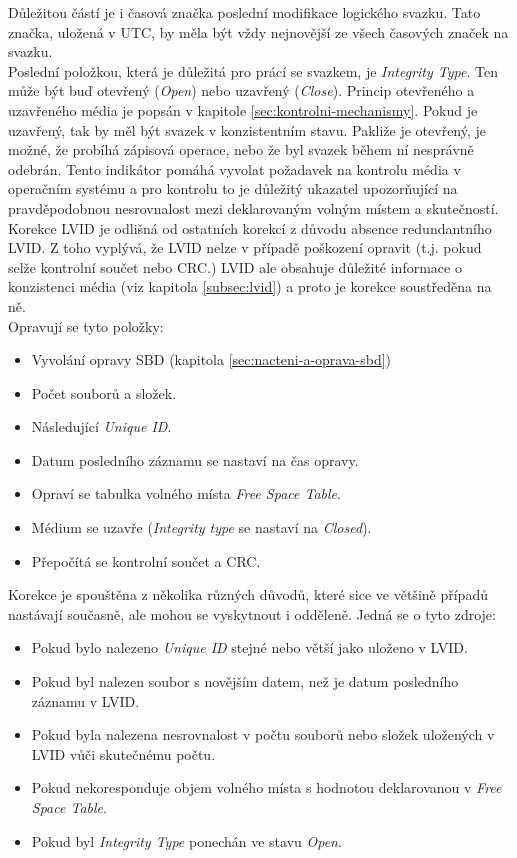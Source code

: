 Důležitou částí je i časová značka poslední modifikace logického svazku. Tato značka, uložená v UTC, by měla být vždy nejnovější ze všech časových značek na svazku.\\
Poslední položkou, která je důležitá pro prácí se svazkem, je \textit{Integrity Type}. Ten může být buď otevřený (\textit{Open}) nebo uzavřený (\textit{Close}). Princip otevřeného a uzavřeného média je popsán v kapitole \ref{sec:kontrolni-mechanismy}. Pokud je uzavřený, tak by měl být svazek v konzistentním stavu. Pakliže je otevřený, je možné, že probíhá zápisová operace, nebo že byl svazek během ní nesprávně odebrán. Tento indikátor pomáhá vyvolat požadavek na kontrolu média v operačním systému a pro kontrolu to je důležitý ukazatel upozorňující na pravděpodobnou nesrovnalost mezi deklarovaným volným místem a skutečností.\\ 
Korekce LVID je odlišná od ostatních korekcí z důvodu absence redundantního LVID. Z toho vyplývá, že LVID nelze v případě poškození opravit (t.j. pokud selže kontrolní součet nebo CRC.) LVID ale obsahuje důležité informace o konzistenci média (viz kapitola \ref{subsec:lvid}) a proto je korekce soustředěna na ně.\\
Opravují se tyto položky:
\begin{itemize}
    \item Vyvolání opravy SBD (kapitola \ref{sec:nacteni-a-oprava-sbd})
    \item Počet souborů a složek.
    \item Následující \textit{Unique ID}.
    \item Datum posledního záznamu se nastaví na čas opravy.
    \item Opraví se tabulka volného místa \textit{Free Space Table}.
    \item Médium se uzavře (\textit{Integrity type} se nastaví na \textit{Closed}).
    \item Přepočítá se kontrolní součet a CRC.
\end{itemize}
Korekce je spouštěna z několika různých důvodů, které sice ve většině případů nastávají současně, ale mohou se vyskytnout i odděleně. Jedná se o tyto zdroje:
\begin{itemize}
    \item Pokud bylo nalezeno \textit{Unique ID} stejné nebo větší jako uloženo v LVID.
    \item Pokud byl nalezen soubor s novějším datem, než je datum posledního záznamu v LVID.
    \item Pokud byla nalezena nesrovnalost v počtu souborů nebo složek uložených v LVID vůči skutečnému počtu.
    \item Pokud nekoresponduje objem volného místa s hodnotou deklarovanou v \textit{Free Space Table}.
    \item Pokud byl \textit{Integrity Type} ponechán ve stavu \textit{Open}.
\end{itemize}

